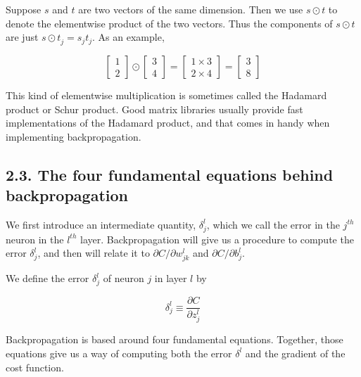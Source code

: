 \documentclass[12 pt]{article}
\begin{document}
Suppose $ s $ and $ t $ are two vectors of the same dimension. Then
we use $ s \odot t $ to denote the elementwise product of the two
vectors. Thus the components of $ s \odot t $ are just $ {s \odot t}_j
= s_j t_j $. As an example,

\begin{equation}
    \left[ \begin{array}{c} 1 \\ 2 \end{array} \right] \odot
    \left[ \begin{array}{c} 3 \\ 4 \end{array} \right] = \left[
    \begin{array}{c} 1 \times 3 \\ 2 \times 4 \end{array} \right] =
    \left[ \begin{array}{c} 3 \\ 8 \end{array} \right]
\end{equation}

This kind of elementwise multiplication is sometimes called the Hadamard
product or Schur product. Good matrix libraries usually provide fast
implementations of the Hadamard product, and that comes in handy when
implementing backpropagation.

\subsection{2.3. The four fundamental equations behind backpropagation}
\label{the-four-fundamental-equations-behind-backpropagation}

We first introduce an intermediate quantity, $ \delta_j^l $,
which we call the error in the $ j^{th} $ neuron in the
$ l^{th} $ layer. Backpropagation will give us a procedure to
compute the error $ \delta_j^l $, and then will relate it to
$ \partial C / \partial w^l_{jk} $ and $ \partial C / \partial b^l_j $.

We define the error $ \delta^l_j $ of neuron $ j $ in layer
$ l $ by

\begin{equation}
    \delta^l_j \equiv \frac {\partial C}{\partial z^l_j}
\end{equation}

Backpropagation is based around four fundamental equations. Together,
those equations give us a way of computing both the error $ \delta^l $
and the gradient of the cost function.
\end{document}
